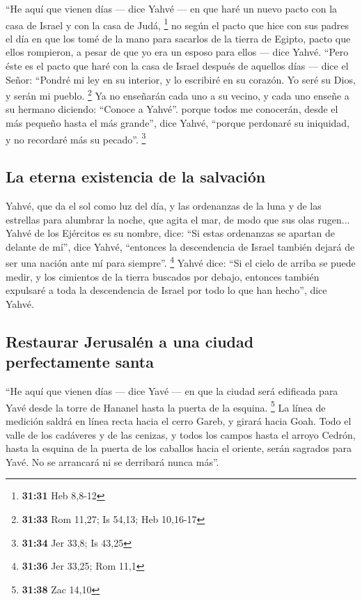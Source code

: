 \begin{paracol}{2}
 ``He aquí que vienen días --- dice Yahvé --- en que haré
un nuevo pacto con la casa de Israel y con la casa de Judá, \footnote{\textbf{31:31}
  Heb 8,8-12}  no según el pacto que hice con sus padres
el día en que los tomé de la mano para sacarlos de la tierra de Egipto,
pacto que ellos rompieron, a pesar de que yo era un esposo para ellos
--- dice Yahvé.  ``Pero éste es el pacto que haré con la
casa de Israel después de aquellos días --- dice el Señor: ``Pondré mi
ley en su interior, y lo escribiré en su corazón. Yo seré su Dios, y
serán mi pueblo. \footnote{\textbf{31:33} Rom 11,27; Is 54,13; Heb
  10,16-17}  Ya no enseñarán cada uno a su vecino, y cada
uno enseñe a su hermano diciendo: ``Conoce a Yahvé''. porque todos me
conocerán, desde el más pequeño hasta el más grande'', dice Yahvé,
``porque perdonaré su iniquidad, y no recordaré más su pecado''.
\footnote{\textbf{31:34} Jer 33,8; Is 43,25}

\hypertarget{la-eterna-existencia-de-la-salvaciuxf3n}{%
\subsection{La eterna existencia de la
salvación}\label{la-eterna-existencia-de-la-salvaciuxf3n}}

 Yahvé, que da el sol como luz del día, y las ordenanzas
de la luna y de las estrellas para alumbrar la noche, que agita el mar,
de modo que sus olas rugen... Yahvé de los Ejércitos es su nombre, dice:
 ``Si estas ordenanzas se apartan de delante de mí'',
dice Yahvé, ``entonces la descendencia de Israel también dejará de ser
una nación ante mí para siempre''. \footnote{\textbf{31:36} Jer 33,25;
  Rom 11,1}  Yahvé dice: ``Si el cielo de arriba se puede
medir, y los cimientos de la tierra buscados por debajo, entonces
también expulsaré a toda la descendencia de Israel por todo lo que han
hecho'', dice Yahvé.

\hypertarget{restaurar-jerusaluxe9n-a-una-ciudad-perfectamente-santa}{%
\subsection{Restaurar Jerusalén a una ciudad perfectamente
santa}\label{restaurar-jerusaluxe9n-a-una-ciudad-perfectamente-santa}}

 ``He aquí que vienen días --- dice Yavé --- en que la
ciudad será edificada para Yavé desde la torre de Hananel hasta la
puerta de la esquina. \footnote{\textbf{31:38} Zac 14,10}
 La línea de medición saldrá en línea recta hacia el
cerro Gareb, y girará hacia Goah.  Todo el valle de los
cadáveres y de las cenizas, y todos los campos hasta el arroyo Cedrón,
hasta la esquina de la puerta de los caballos hacia el oriente, serán
sagrados para Yavé. No se arrancará ni se derribará nunca más''.


\end{paracol}
